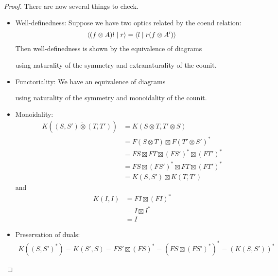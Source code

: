 \documentclass[11pt,letterpaper]{article}
\theoremstyle{plain}
\theoremstyle{definition}
\newcommand{\switched}{\mathbin{\tilde{\otimes}}}
\newcommand{\teletimes}{\mathbin{\boxtimes}}
\newcommand{\rep}[2]{{\ensuremath \left\langle #1 \mid #2 \right\rangle}}
\newcommand{\todo}[1]{\textcolor{red}{\small #1}}
\begin{document}
\begin{proof}
There are now several things to check.
\begin{itemize}
\item Well-definedness: Suppose we have two optics related by the coend relation:
  \begin{align*}
    \rep{(f \otimes A) l}{r} = \rep{l}{r (f \otimes A')}
  \end{align*}
  Then well-definedness is shown by the equivalence of diagrams
  \begin{center}
    
    \qquad \raisebox{1.5cm}{$=$} \qquad
    
  \end{center}
  using naturality of the symmetry and extranaturality of the counit.
\item Functoriality: We have an equivalence of diagrams
  \begin{center}
    
    \quad \raisebox{1.5cm}{$=$} \quad
    
  \end{center}
using naturality of the symmetry and monoidality of the counit.
\item Monoidality:
\begin{align*}
K((S, S') \switched (T, T'))
&= K(S \otimes T, T' \otimes S) \\
&= F(S \otimes T) \teletimes {F(T' \otimes S')}^* \\
&= FS \teletimes FT \teletimes {(FS')}^* \teletimes {(FT')}^* \\
&= FS \teletimes {(FS')}^* \teletimes FT \teletimes {(FT')}^* \\
&= K(S, S') \teletimes K(T, T')
\end{align*}
and
\begin{align*}
K(I, I)
&= FI \teletimes {(FI)}^* \\
&= I \teletimes I^* \\
&= I
\end{align*}
\item Preservation of duals:
\begin{align*}
K({(S, S')}^*)
= K(S', S)
= FS' \teletimes {(FS)}^*
= {(FS \teletimes {(FS')}^*)}^*
= {(K(S, S'))}^*
\end{align*}


\end{itemize}
\end{proof}
\end{document}
